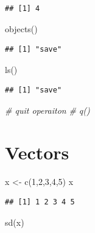 \documentclass[
]{book}
\newenvironment{Shaded}{\begin{snugshade}}{\end{snugshade}}
\newcommand{\CommentTok}[1]{\textcolor[rgb]{0.56,0.35,0.01}{\textit{#1}}}
\newcommand{\DecValTok}[1]{\textcolor[rgb]{0.00,0.00,0.81}{#1}}
\newcommand{\FunctionTok}[1]{\textcolor[rgb]{0.00,0.00,0.00}{#1}}
\newcommand{\NormalTok}[1]{#1}
\newcommand{\OtherTok}[1]{\textcolor[rgb]{0.56,0.35,0.01}{#1}}
\theoremstyle{definition}
\theoremstyle{definition}
\theoremstyle{definition}
\theoremstyle{definition}
\theoremstyle{remark}
\begin{document}
\begin{verbatim}
## [1] 4
\end{verbatim}

\begin{Shaded}
\begin{Highlighting}[]
\FunctionTok{objects}\NormalTok{()}
\end{Highlighting}
\end{Shaded}

\begin{verbatim}
## [1] "save"
\end{verbatim}

\begin{Shaded}
\begin{Highlighting}[]
\FunctionTok{ls}\NormalTok{()}
\end{Highlighting}
\end{Shaded}

\begin{verbatim}
## [1] "save"
\end{verbatim}

\begin{Shaded}
\begin{Highlighting}[]
\CommentTok{\# quit operaiton}
\CommentTok{\# q() }
\end{Highlighting}
\end{Shaded}

\hypertarget{vectors}{%
\section{Vectors}\label{vectors}}

\begin{Shaded}
\begin{Highlighting}[]
\NormalTok{x }\OtherTok{\textless{}{-}} \FunctionTok{c}\NormalTok{(}\DecValTok{1}\NormalTok{,}\DecValTok{2}\NormalTok{,}\DecValTok{3}\NormalTok{,}\DecValTok{4}\NormalTok{,}\DecValTok{5}\NormalTok{)}
\NormalTok{x}
\end{Highlighting}
\end{Shaded}

\begin{verbatim}
## [1] 1 2 3 4 5
\end{verbatim}

\begin{Shaded}
\begin{Highlighting}[]
\FunctionTok{sd}\NormalTok{(x)}
\end{Highlighting}
\end{Shaded}
\end{document}

